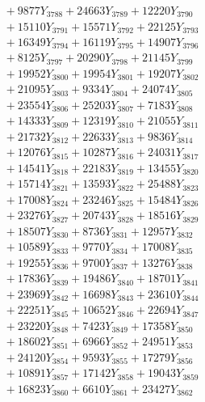 \documentclass[a4paper,10pt]{article}
\begin{document}
{\begin{align}
&\;  + 9877 Y_{3788} + 24663 Y_{3789} + 12220 Y_{3790} \\[0.3ex]
&\;  + 15110 Y_{3791} + 15571 Y_{3792} + 22125 Y_{3793} \\[0.3ex]
&\;  + 16349 Y_{3794} + 16119 Y_{3795} + 14907 Y_{3796} \\[0.3ex]
&\;  + 8125 Y_{3797} + 20290 Y_{3798} + 21145 Y_{3799} \\[0.3ex]
&\;  + 19952 Y_{3800} + 19954 Y_{3801} + 19207 Y_{3802} \\[0.3ex]
&\;  + 21095 Y_{3803} + 9334 Y_{3804} + 24074 Y_{3805} \\[0.3ex]
&\;  + 23554 Y_{3806} + 25203 Y_{3807} + 7183 Y_{3808} \\[0.5ex]\allowbreak
&\;  + 14333 Y_{3809} + 12319 Y_{3810} + 21055 Y_{3811} \\[0.3ex]
&\;  + 21732 Y_{3812} + 22633 Y_{3813} + 9836 Y_{3814} \\[0.3ex]
&\;  + 12076 Y_{3815} + 10287 Y_{3816} + 24031 Y_{3817} \\[0.3ex]
&\;  + 14541 Y_{3818} + 22183 Y_{3819} + 13455 Y_{3820} \\[0.3ex]
&\;  + 15714 Y_{3821} + 13593 Y_{3822} + 25488 Y_{3823} \\[0.3ex]
&\;  + 17008 Y_{3824} + 23246 Y_{3825} + 15484 Y_{3826} \\[0.3ex]
&\;  + 23276 Y_{3827} + 20743 Y_{3828} + 18516 Y_{3829} \\[0.3ex]
&\;  + 18507 Y_{3830} + 8736 Y_{3831} + 12957 Y_{3832} \\[0.3ex]
&\;  + 10589 Y_{3833} + 9770 Y_{3834} + 17008 Y_{3835} \\[0.3ex]
&\;  + 19255 Y_{3836} + 9700 Y_{3837} + 13276 Y_{3838} \\[0.5ex]\allowbreak
&\;  + 17836 Y_{3839} + 19486 Y_{3840} + 18701 Y_{3841} \\[0.3ex]
&\;  + 23969 Y_{3842} + 16698 Y_{3843} + 23610 Y_{3844} \\[0.3ex]
&\;  + 22251 Y_{3845} + 10652 Y_{3846} + 22694 Y_{3847} \\[0.3ex]
&\;  + 23220 Y_{3848} + 7423 Y_{3849} + 17358 Y_{3850} \\[0.3ex]
&\;  + 18602 Y_{3851} + 6966 Y_{3852} + 24951 Y_{3853} \\[0.3ex]
&\;  + 24120 Y_{3854} + 9593 Y_{3855} + 17279 Y_{3856} \\[0.3ex]
&\;  + 10891 Y_{3857} + 17142 Y_{3858} + 19043 Y_{3859} \\[0.3ex]
&\;  + 16823 Y_{3860} + 6610 Y_{3861} + 23427 Y_{3862} \\[0.3ex]

\end{align}}
\end{document}
